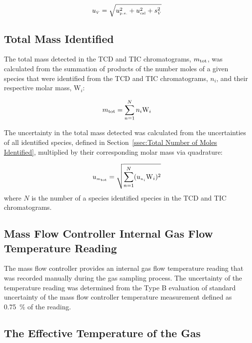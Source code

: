 \documentclass[12pt]{article}
\begin{document}
\begin{equation}
\label{eq:volumetric_flow_uncertainty}
u_{\scriptscriptstyle \dot{V}} = \sqrt{u_{\rm \scriptscriptstyle p.e.}^2 + u_{\rm \scriptscriptstyle cal}^2 + s_{\scriptscriptstyle \dot{V}}^2}
\end{equation}

\subsection{Total Mass Identified}
\label{ssec:Total_Mass_Identified_into_GC/MSD}
The total mass detected in the TCD and TIC chromatograms, $m_{\rm tot}$, was calculated from the summation of products of the number moles of a given species that were identified from the TCD and TIC chromatograms, $n_{i}$, and their respective molar mass, ${\textrm{W}_{i}}$:

\begin{equation}
\label{eq:total_mass_detected_uncertainty}
m_{\rm tot}=\sum_{n=1}^{N} n_{i}{\textrm{W}_{i}}
\end{equation}

The uncertainty in the total mass detected was calculated from the uncertainties of all identified species, defined in Section~\ref{ssec:Total Number of Moles Identified}, multiplied by their corresponding molar mass via quadrature:

\begin{equation}
\label{eq:total_mass_detected_uncertainty}
u_{\scriptscriptstyle m_{\rm tot}}=\sqrt{{\sum_{n=1}^{N} (u_{\scriptscriptstyle n_{i}}{\textrm{W}_{i}})^2}}
\end{equation}
where $N$ is the number of a species identified species in the TCD and TIC chromatograms.

\subsection{Mass Flow Controller Internal Gas Flow Temperature Reading}
\label{ssec:MFC_Temp}

The mass flow controller provides an internal gas flow temperature reading that was recorded manually during the gas sampling process. The uncertainty of the temperature reading was determined from the Type B evaluation of standard uncertainty of the mass flow controller temperature measurement defined as 0.75~\% of the reading.

\subsection{The Effective Temperature of the Gas}
\label{ssec:Probe_Temp}
\end{document}
